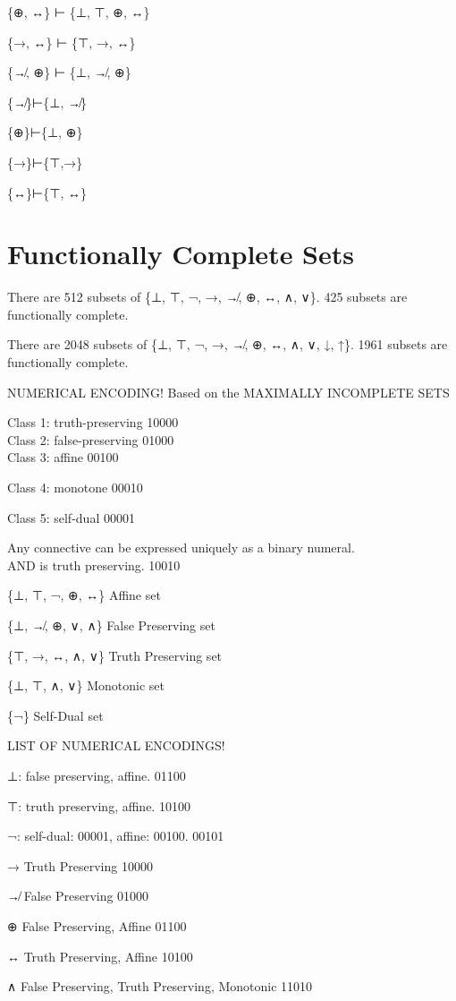 \{⊕, ↔\} ⊢ \{⊥, ⊤, ⊕, ↔\}

\{→, ↔\} ⊢ \{⊤, →, ↔\}

\{↛, ⊕\} ⊢ \{⊥, ↛, ⊕\}

\{↛\}⊢\{⊥, ↛\}

\{⊕\}⊢\{⊥, ⊕\}

\{→\}⊢\{⊤,→\}

\{↔\}⊢\{⊤, ↔\}

\hypertarget{functionally-complete-sets}{%
\section{Functionally Complete Sets}\label{functionally-complete-sets}}

There are 512 subsets of \{⊥, ⊤, ¬, →, ↛, ⊕, ↔, ∧, ∨\}. 425 subsets are
functionally complete.

There are 2048 subsets of \{⊥, ⊤, ¬, →, ↛, ⊕, ↔, ∧, ∨, ↓, ↑\}. 1961
subsets are functionally complete.

NUMERICAL ENCODING! Based on the MAXIMALLY INCOMPLETE SETS

Class 1: truth-preserving 10000\\
Class 2: false-preserving 01000\\
Class 3: affine 00100

Class 4: monotone 00010

Class 5: self-dual 00001

Any connective can be expressed uniquely as a binary numeral.\\
AND is truth preserving. 10010

\{⊥, ⊤, ¬, ⊕, ↔\} Affine set

\{⊥, ↛, ⊕, ∨, ∧\} False Preserving set

\{⊤, →, ↔, ∧, ∨\} Truth Preserving set

\{⊥, ⊤, ∧, ∨\} Monotonic set

\{¬\} Self-Dual set

LIST OF NUMERICAL ENCODINGS!

⊥: false preserving, affine. 01100

⊤: truth preserving, affine. 10100

¬: self-dual: 00001, affine: 00100. 00101

→ Truth Preserving 10000

↛ False Preserving 01000

⊕ False Preserving, Affine 01100

↔ Truth Preserving, Affine 10100

∧ False Preserving, Truth Preserving, Monotonic 11010

